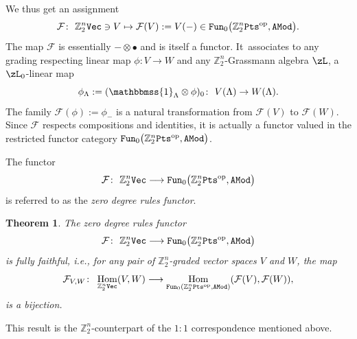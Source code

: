 \documentclass[pdftex]{sigma}%
\newcommand{\Id}{\mathbbmss{1}}
\newcommand{\op}[1]{\operatorname{#1}}
\DeclareMathOperator{\Hom}{Hom}
\newcommand{\catname}[1]{\textnormal{\texttt{#1}}}
\newcommand{\Z}{{\mathbb Z}}
\def\cF{\mathcal{F}}
\newcommand{\0}{\otimes}
\numberwithin{equation}{section}
\newtheorem{Theorem}{Theorem}[section]
\begin{document}
We thus get an assignment
\[
\cF\colon\ \Z_2^n{\tt Vec}\ni V\mapsto \cF( V):= V(-)\in{\tt Fun}_0\big(\Z_2^n{\tt Pts}^{\op{op}}, \tt AMod\big).
\]
The map $\cF$ is essentially $-\0\bullet$ and is itself a functor. It~associates to any grading respecting linear map $\phi \colon {V} \rightarrow {W}$ and any $\Z_2^n$-Grassmann algebra $\zL$, a $\zL_0$-linear map
\[
\phi_\Lambda := (\Id_\Lambda \otimes \phi)_0\colon\ {V}(\Lambda) \rightarrow {W}(\Lambda).
\]
The family $\cF(\phi):=\phi_-$ is a natural transformation from $\cF( V)$ to $\cF( W)$. Since $\cF$ respects compositions and identities, it is actually a functor valued in the restricted functor category ${\tt Fun}_0\big(\Z_2^n{\tt Pts}^{\op{op}},\tt AMod\big)$.
%
\begin{Definition}\label{def:Vfun}
The functor
%
\[
\mathcal{F} \colon\ \Z_2^n\catname{Vec} \longrightarrow {\tt Fun}_0\big(\Z_2^n\catname{Pts}^\textnormal{op}, \catname{AMod}\big)
\]
is referred to as the {\it zero degree rules functor}.
%
\end{Definition}
%
\begin{Theorem}\label{trm:FFullyFaith}
The zero degree rules functor
\[
\mathcal{F} \colon\ \Z_2^n\catname{Vec} \longrightarrow {\tt Fun}_0\big(\Z_2^n\catname{Pts}^\textnormal{op}, \catname{AMod}\big)
\]
is fully faithful, i.e., for any pair of $\Z_2^n$-graded vector spaces ${V}$ and ${W}$, the map
%
\[
\mathcal{F}_{ V, W} \colon \ \Hom_{\Z_2^n\catname{Vec}}({V} , {W}) \longrightarrow \Hom_{{\tt Fun}_0(\Z_2^n\catname{Pts}^\textnormal{op}, \catname{AMod})} (\mathcal{F}({V}) ,\mathcal{F}({W}) ),
\]
%
is a bijection.
\end{Theorem}
%

This result is the $\Z_2^n$-counterpart of the $1:1$ correspondence mentioned above.
\end{document}
